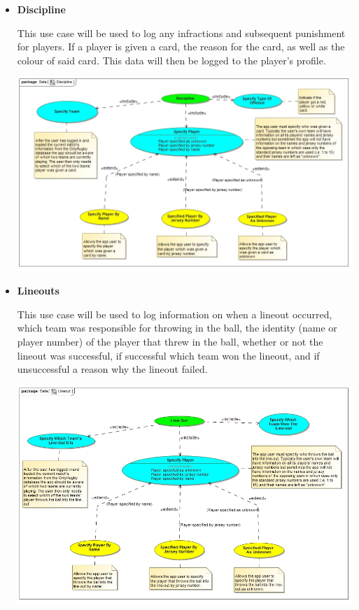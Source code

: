 \documentclass[a4paper,12pt]{report}
\begin{document}
\begin{itemize}
\begin{center}
		\end{center}
\newpage
	\item \textbf{Discipline}
		\begin{flushleft}
		This use case will be used to log any infractions and subsequent punishment for players. If a player is given a card, the reason for the card, as well as the colour of said card. This data will then be logged to the player's profile.
		\end{flushleft}
		\begin{center}
		\includegraphics[width=1\textwidth]{./Diagrams/Discipline.jpg}\\[0.4cm]
		\end{center}
\newpage
	\item \textbf{Lineouts}
		\begin{flushleft}
		This use case will be used to log information on when a lineout occurred, which team was responsible for throwing in the ball, the identity (name or player number) of the player that threw in the ball, whether or not the lineout was successful, if successful which team won the lineout, and if unsuccessful a reason why the lineout failed.
		\end{flushleft}
		\begin{center}
		\includegraphics[width=1\textwidth]{./Diagrams/Lineout.jpg}\\[0.4cm]

\end{center}
\end{itemize}
\end{document}
